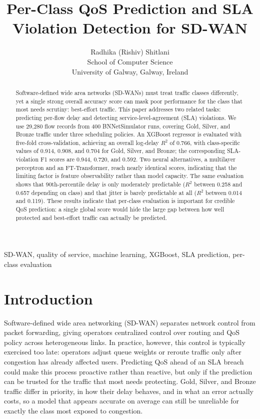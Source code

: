 \documentclass[12pt,onecolumn]{IEEEtran}
\title{Per-Class QoS Prediction and SLA Violation Detection for SD-WAN}
\author{Radhika (Rishiv) Shitlani\\
School of Computer Science\\
University of Galway, Galway, Ireland}
\begin{document}
\maketitle

\begin{abstract}
Software-defined wide area networks (SD-WANs) must treat traffic classes differently, yet a single strong overall accuracy score can mask poor performance for the class that most needs scrutiny: best-effort traffic. This paper addresses two related tasks: predicting per-flow delay and detecting service-level-agreement (SLA) violations. We use 29,280 flow records from 400 BNNetSimulator runs, covering Gold, Silver, and Bronze traffic under three scheduling policies. An XGBoost regressor is evaluated with five-fold cross-validation, achieving an overall log-delay $R^2$ of 0.766, with class-specific values of 0.914, 0.908, and 0.704 for Gold, Silver, and Bronze; the corresponding SLA-violation F1 scores are 0.944, 0.720, and 0.592. Two neural alternatives, a multilayer perceptron and an FT-Transformer, reach nearly identical scores, indicating that the limiting factor is feature observability rather than model capacity. The same evaluation shows that 90th-percentile delay is only moderately predictable ($R^2$ between 0.258 and 0.657 depending on class) and that jitter is barely predictable at all ($R^2$ between 0.014 and 0.119). These results indicate that per-class evaluation is important for credible QoS prediction: a single global score would hide the large gap between how well protected and best-effort traffic can actually be predicted.
\end{abstract}

\begin{IEEEkeywords}
SD-WAN, quality of service, machine learning, XGBoost, SLA prediction, per-class evaluation
\end{IEEEkeywords}

\section{Introduction}

Software-defined wide area networking (SD-WAN) separates network control from packet forwarding, giving operators centralized control over routing and QoS policy across heterogeneous links. In practice, however, this control is typically exercised too late: operators adjust queue weights or reroute traffic only after congestion has already affected users. Predicting QoS ahead of an SLA breach could make this process proactive rather than reactive, but only if the prediction can be trusted for the traffic that most needs protecting. Gold, Silver, and Bronze traffic differ in priority, in how their delay behaves, and in what an error actually costs, so a model that appears accurate on average can still be unreliable for exactly the class most exposed to congestion.
\end{document}

